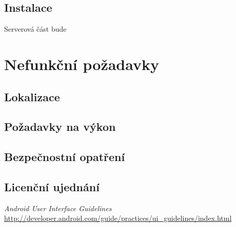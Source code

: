 \documentclass[a4paper,10pt]{article}
\begin{document}
\subsection{Instalace}
Serverová část bude 
\section{Nefunkční požadavky}
\subsection{Lokalizace}
\subsection{Požadavky na výkon}
\subsection{Bezpečnostní opatření}
\subsection{Licenční ujednání}
\begin{thebibliography}{1}
	{\em Android User Interface Guidelines}
		\url{http://developer.android.com/guide/practices/ui_guidelines/index.html}
\end{thebibliography}
\end{document}
